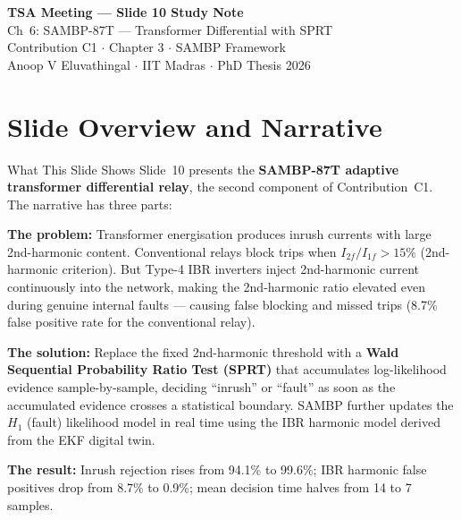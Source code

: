 \documentclass[12pt,a4paper]{article}
\begin{document}
\begin{tcolorbox}[colback=iitmnavy,coltext=white,arc=4pt,boxrule=0pt]
\begin{center}
  {\Large\bfseries TSA Meeting --- Slide 10 Study Note}\\[4pt]
  {\large Ch~6: SAMBP-87T --- Transformer Differential with SPRT}\\[6pt]
  {\normalsize Contribution C1 $\cdot$ Chapter 3 $\cdot$ SAMBP Framework}\\[2pt]
  {\small Anoop V Eluvathingal $\cdot$ IIT Madras $\cdot$ PhD Thesis 2026}
\end{center}
\end{tcolorbox}

\vspace{6pt}

\section{Slide Overview and Narrative}

\begin{keybox}{What This Slide Shows}
Slide~10 presents the \textbf{SAMBP-87T adaptive transformer differential relay}, the second component of Contribution~C1. The narrative has three parts:

\textbf{The problem:} Transformer energisation produces inrush currents with large 2nd-harmonic content. Conventional relays block trips when $I_{2f}/I_{1f} > 15\%$ (2nd-harmonic criterion). But Type-4 IBR inverters inject 2nd-harmonic current continuously into the network, making the 2nd-harmonic ratio elevated even during genuine internal faults --- causing false blocking and missed trips (8.7\% false positive rate for the conventional relay).

\textbf{The solution:} Replace the fixed 2nd-harmonic threshold with a \textbf{Wald Sequential Probability Ratio Test (SPRT)} that accumulates log-likelihood evidence sample-by-sample, deciding ``inrush'' or ``fault'' as soon as the accumulated evidence crosses a statistical boundary. SAMBP further updates the $H_1$ (fault) likelihood model in real time using the IBR harmonic model derived from the EKF digital twin.

\textbf{The result:} Inrush rejection rises from 94.1\% to 99.6\%; IBR harmonic false positives drop from 8.7\% to 0.9\%; mean decision time halves from 14 to 7 samples.
\end{keybox}
\end{document}
